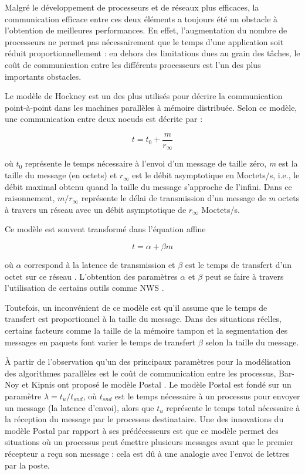 Malgré le développement de processeurs et de réseaux plus efficaces,
la communication efficace entre ces deux éléments a toujours été un
obstacle à l'obtention de meilleures performances. En effet, l'augmentation
du nombre de processeurs ne permet pas nécessairement que le temps
d'une application soit réduit proportionnellement : en dehors des
limitations dues au grain des tâches, le coût de communication entre
les différents processeurs est l'un des plus importants obstacles.

Le modèle de Hockney \cite{Hockney94} est un des plus utilisés pour
décrire la communication point-à-point dans les machines parallèles
à mémoire distribuée. Selon ce modèle, une communication entre deux
noeuds est décrite par : 

\[
t=t_{0}+\frac{m}{r_{\infty}}\]


où $t_{0}$ représente le temps nécessaire à l'envoi d'un message
de taille zéro, \emph{m} est la taille du message (en octets) et $r_{\infty}$
est le débit asymptotique en Moctets/s, i.e., le débit maximal obtenu
quand la taille du message s'approche de l'infini. Dans ce raisonnement,
$m/r_{\infty}$ représente le délai de transmission d'un message de
\emph{m} octets à travers un réseau avec un débit asymptotique de
$r_{\infty}$ Moctets/s.

Ce modèle est souvent transformé dans l'équation affine 

\[
t=\alpha+\beta m\]


où $\alpha$ correspond à la latence de transmission et $\beta$ est
le temps de transfert d'un octet sur ce réseau \cite{Pjesivac-Grbovic05}.
L'obtention des paramètres $\alpha$ et $\beta$ peut se faire à travers
l'utilisation de certains outils comme NWS \cite{Wolski97}. 

Toutefois, un inconvénient de ce modèle est qu'il assume que le temps
de transfert est proportionnel à la taille du message. Dans des situations
réelles, certains facteurs comme la taille de la mémoire tampon et
la segmentation des messages en paquets font varier le temps de transfert
$\beta$ selon la taille du message. 

À partir de l'observation qu'un des principaux paramètres pour la
modélisation des algorithmes parallèles est le coût de communication
entre les processus, Bar-Noy et Kipnis ont proposé le modèle Postal
\cite{Bar-Noy94}. Le modèle Postal est fondé sur un paramètre $\lambda=t_{u}/t_{snd}$,
où $t_{snd}$ est le temps nécessaire à un processus pour envoyer
un message (la latence d'envoi), alors que $t_{u}$ représente le
temps total nécessaire à la réception du message par le processus
destinataire. Une des innovations du modèle Postal par rapport à ses
prédécesseurs est que ce modèle permet des situations où un processus
peut émettre plusieurs messages avant que le premier récepteur a reçu
son message : cela est dû à une analogie avec l'envoi de lettres par
la poste. 

